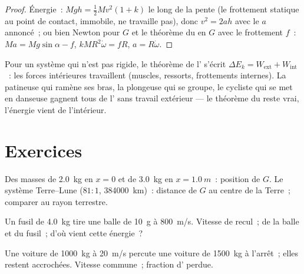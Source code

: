 \begin{proof}
Énergie~: $Mgh = \tfrac12 Mv^2(1 + k)$ le long de la pente (le frottement
statique au point de contact, immobile, ne travaille pas), donc
$v^2 = 2ah$ avec le $a$ annoncé~; ou bien Newton pour $G$ et le théorème
du  en $G$ avec le frottement $f$~: $Ma = Mg\sin\alpha - f$,
$kMR^2\dot\omega = fR$, $a = R\dot\omega$.
\end{proof}

\begin{remark}\label{rem:b1:systems-of-points:deformable}
Pour un système qui n'est pas rigide, le théorème de l'
s'écrit $\Delta E_k = W_{\mathrm{ext}} + W_{\mathrm{int}}$~: les forces
intérieures travaillent (muscles, ressorts, frottements internes). La
patineuse qui ramène ses bras, la plongeuse qui se groupe, le cycliste
qui se met en danseuse gagnent tous de l' sans travail
extérieur --- le théorème du  reste vrai, l'énergie vient
de l'intérieur.
\end{remark}

\section{Exercices}

\begin{exercise}[$\star$]\label{exo:b1:systems-of-points:1}
Des masses de \qty{2.0}{kg} en $x = 0$ et de \qty{3.0}{kg} en $x = \qty{1.0}{m}$~:
position de $G$. Le système Terre--Lune ($81:1$, \qty{384000}{km})~:
distance de $G$ au centre de la Terre~; comparer au rayon terrestre.
\end{exercise}

\begin{exercise}[$\star$]\label{exo:b1:systems-of-points:2}
Un fusil de \qty{4.0}{kg} tire une balle de \qty{10}{g} à \qty{800}{m/s}.
Vitesse de recul~;  de la balle et du fusil~; d'où
vient cette énergie~?
\end{exercise}

\begin{exercise}[$\star$]\label{exo:b1:systems-of-points:3}
Une voiture de \qty{1000}{kg} à \qty{20}{m/s} percute une voiture de
\qty{1500}{kg} à l'arrêt~; elles restent accrochées. Vitesse commune~;
fraction d' perdue.
\end{exercise}

